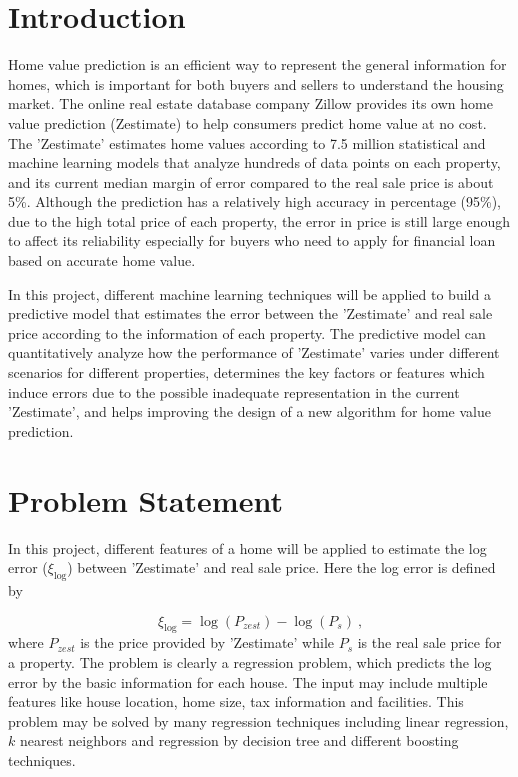 \documentclass[12pt]{article}
\begin{document}
\maketitle

\section{Introduction}\label{sec:introduction}
Home value prediction is an efficient way to represent the general information for homes, which is important for both buyers and sellers to understand the housing market. The online real estate database company Zillow provides its own home value prediction (Zestimate) to help consumers predict home value at no cost. The 'Zestimate' estimates home values according to 7.5 million statistical and machine learning models that analyze hundreds of data points on each property, and its current median margin of error compared to the real sale price is about 5\%. Although the prediction has a relatively high accuracy in percentage (95\%), due to the high total price of each property, the error in price is still large enough to affect its reliability especially for buyers who need to apply for financial loan based on accurate home value. 

In this project, different machine learning techniques will be applied to build a predictive model that estimates the error between the 'Zestimate' and real sale price according to the information of each property. The predictive model can quantitatively analyze how the performance of 'Zestimate' varies under different scenarios for different properties, determines the key factors or features which induce errors due to the possible inadequate representation in the current 'Zestimate', and helps improving the design of a new algorithm for home value prediction.

\section{Problem Statement}\label{sec:problemstate}
In this project, different features of a home will be applied to estimate the log error ($\xi_{\log}$) between 'Zestimate' and real sale price. Here the log error is defined by

\begin{equation}
\xi_{\log}=\log(P_{zest})-\log(P_s)~\text{,}
\label{eq:define-log-error}
\end{equation}
where $P_{zest}$ is the price provided by 'Zestimate' while $P_s$ is the real sale price for a property. The problem is clearly a regression problem, which predicts the log error by the basic information for each house. The input may include multiple features like house location, home size, tax information and facilities. This problem may be solved by many regression techniques including linear regression, $k$ nearest neighbors and regression by decision tree and different boosting techniques.
\end{document}
